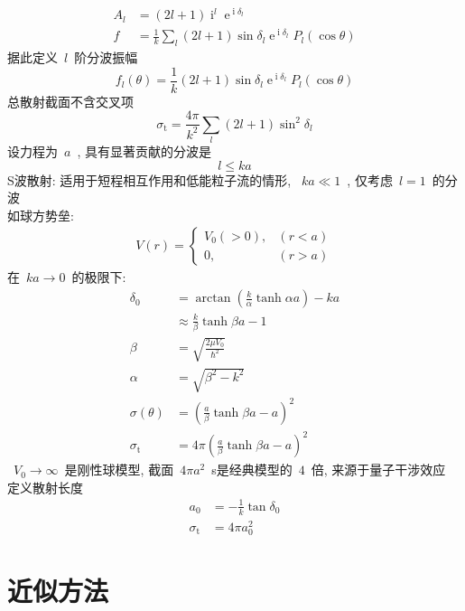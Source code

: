 \documentclass[11pt,a4paper,twocolumn,fleqn]{article}%
\DeclareMathOperator{\mi}{i}
\DeclareMathOperator{\e}{e}%
\renewcommand{\[}{~$}
\renewcommand{\]}{$~}%
\begin{document}
\begin{enumerate}
  	\begin{align}
  	 A_l &= (2l+1)\mi^l\e^{\mi\delta_l} \\
  	 f &= \frac 1k\sum_l(2l+1)\sin\delta_l\e^{\mi\delta_l}P_l(\cos\theta)
  	\end{align}
  	据此定义\[l\]阶分波振幅
  	\begin{equation}
  	 f_l(\theta) = \frac 1k(2l+1)\sin\delta_l\e^{\mi\delta_l}P_l(\cos\theta)
  	\end{equation}
  	总散射截面不含交叉项
  	\begin{equation}
  	 \sigma_{\mathrm{t}} = \frac{4\pi}{k^2}\sum_l(2l+1)\sin^2\delta_l
  	\end{equation}
  	设力程为\[a\], 具有显著贡献的分波是
  	\begin{equation}
  	 l\le ka
  	\end{equation}
  	S波散射: 适用于短程相互作用和低能粒子流的情形, \[ka\ll 1\], 仅考虑\[l=1\]的分波\\
  	如球方势垒: 
  	\begin{align}
  	 V(r) = \left\{\begin{array}{ll}
  	 V_0(>0),	&(r<a) \\
  	 0,		&(r>a)
  	 \end{array}\right.
  	\end{align}
  	在\[ka\to 0\]的极限下: 
  	\begin{align}
  	 \delta_0 &= \arctan\left(\frac{k}{\alpha} \tanh \alpha a\right) - ka \\
  	 &\approx \frac{k}{\beta}\tanh\beta a - 1 \\
  	 \beta &= \sqrt{\frac{2\mu V_0}{\hbar^2}}\\
  	 \alpha &= \sqrt{\beta^2 - k^2} \\
  	 \sigma(\theta) &= \left(\frac{a}{\beta}\tanh\beta a - a\right)^2 \\
  	 \sigma_{\mathrm{t}} &= 4\pi \left(\frac{a}{\beta}\tanh\beta a - a\right)^2
  	\end{align}
  	\[V_0\to\infty\]是刚性球模型, 截面\[4\pi a^2\]s是经典模型的\[4\]倍, 来源于量子干涉效应\\
  	定义散射长度
  	\begin{align}
  	 a_0 &= -\frac{1}{k}\tan\delta_0 \\
  	 \sigma_{\mathrm{t}} &= 4\pi a_0^2
  	\end{align}
 \end{enumerate} 
\section{近似方法}
\end{document}
